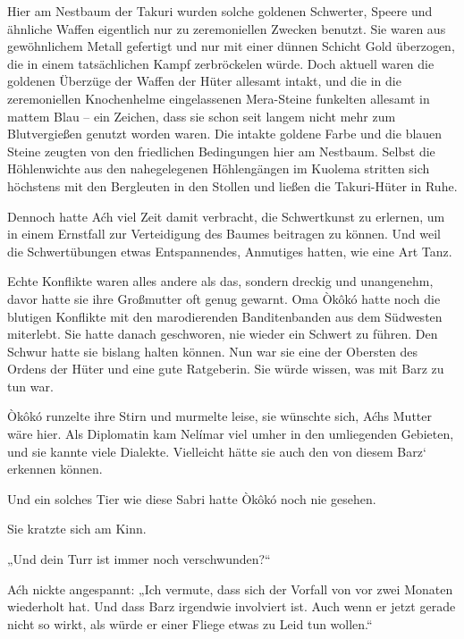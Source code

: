 Hier am Nestbaum der Takuri wurden solche goldenen Schwerter, Speere und ähnliche Waffen eigentlich nur zu zeremoniellen Zwecken benutzt. Sie waren aus gewöhnlichem Metall gefertigt und nur mit einer dünnen Schicht Gold überzogen, die in einem tatsächlichen Kampf zerbröckelen würde. Doch aktuell waren die goldenen Überzüge der Waffen der Hüter allesamt intakt, und die in die zeremoniellen Knochenhelme eingelassenen Mera-Steine funkelten allesamt in mattem Blau – ein Zeichen, dass sie schon seit langem nicht mehr zum Blutvergießen genutzt worden waren. Die intakte goldene Farbe und die blauen Steine zeugten von den friedlichen Bedingungen hier am Nestbaum. Selbst die Höhlenwichte aus den nahegelegenen Höhlengängen im Kuolema stritten sich höchstens mit den Bergleuten in den Stollen und ließen die Takuri-Hüter in Ruhe.

Dennoch hatte Aćh viel Zeit damit verbracht, die Schwertkunst zu erlernen, um in einem Ernstfall zur Verteidigung des Baumes beitragen zu können. Und weil die Schwertübungen etwas Entspannendes, Anmutiges hatten, wie eine Art Tanz.

Echte Konflikte waren alles andere als das, sondern dreckig und unangenehm, davor hatte sie ihre Großmutter oft genug gewarnt. Oma Òkôkó hatte noch die blutigen Konflikte mit den marodierenden Banditenbanden aus dem Südwesten miterlebt. Sie hatte danach geschworen, nie wieder ein Schwert zu führen. Den Schwur hatte sie bislang halten können. Nun war sie eine der Obersten des Ordens der Hüter und eine gute Ratgeberin. Sie würde wissen, was mit Barz zu tun war.\bigskip







Òkôkó runzelte ihre Stirn und murmelte leise, sie wünschte sich, Aćhs Mutter wäre hier. Als Diplomatin kam Nelímar viel umher in den umliegenden Gebieten, und sie kannte viele Dialekte. Vielleicht hätte sie auch den von diesem Barz‘ erkennen können.

Und ein solches Tier wie diese Sabri hatte Òkôkó noch nie gesehen.

Sie kratzte sich am Kinn.

„Und dein Turr ist immer noch verschwunden?“

Aćh nickte angespannt: „Ich vermute, dass sich der Vorfall von vor zwei Monaten wiederholt hat. Und dass Barz irgendwie involviert ist. Auch wenn er jetzt gerade nicht so wirkt, als würde er einer Fliege etwas zu Leid tun wollen.“

